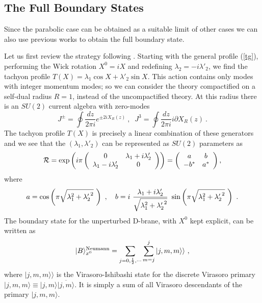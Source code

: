 \documentclass[a4paper,12pt]{article}
\begin{document}

\subsection{The Full Boundary States}
Since the parabolic case can be obtained as a suitable limit of other 
cases we can also use previous works to obtain the full boundary state.

Let us first review the strategy following \cite{Sen1}. 
Starting with the general profile (\ref{tg}), performing the Wick rotation $ X^0 = i X$
and redefining $\lambda_2 = - i \lambda'_2$, we find the tachyon profile 
$T(X)=\lambda_1 \cos X+\lambda'_2 \sin X$. This action contains only modes with
integer momentum modes; so we can consider the theory compactified on a self-dual 
radius $R=1$,  instead of the uncompactified theory. At this radius there is an $SU(2)$ 
current algebra with zero-modes
\begin{equation}
J^{\pm}=\oint \frac{dz}{2 \pi i} e^{\pm 2 i X_R (z)}~, \;\;
J^3=\oint \frac{dz}{2 \pi i} i \partial X_R (z)~.
\end{equation}
The tachyon profile $T(X)$ is precisely a linear combination of these  generators
and we see that the $(\lambda_1, \lambda'_2)$ can be represented as $SU(2)$
parameters as
\begin{equation}
{\cal R} = \exp \left( i \pi 
\left( \begin{array}{cc} 0 & \lambda_1+i \lambda'_2 \\ 
\lambda_1-i \lambda'_2 & 0 \end{array} \right)
\right)= 
\left( \begin{array}{cc} a & b \\ -b^* & a^* \end{array} \right),
\end{equation}
where 
\begin{equation}
a= \cos  \left(\pi \sqrt{\lambda_1^2+{\lambda'_2}^2}~\right)~, ~~~
b= i ~{\lambda_1+ i \lambda'_2\over \sqrt{\lambda_1^2+{\lambda'_2}^2}}
~\sin \left(\pi \sqrt{\lambda_1^2+{\lambda'_2}^2}~\right)
~.
\end{equation}
The boundary state for the unperturbed D-brane, with $X^0$ kept explicit,
can be written as
\cite{Callan et al}
\begin{equation}
|B \rangle_{x^0}^{\rm Neumann} =  \sum_{j=0, \frac{1}{2}, \cdots}
\sum_{m=j}^j | j,m,m \rangle \rangle ~,
\end{equation}
where $| j,m,m \rangle \rangle$ is the 
Virasoro-Ishibashi state \cite{Ishibashi} for the discrete Virasoro primary 
$|j,m,m \rangle \equiv |j,m \rangle \overline{|j,m \rangle}$. It is 
simply a sum of all Virasoro descendants of the primary $|j,m,m \rangle$.
\end{document}
